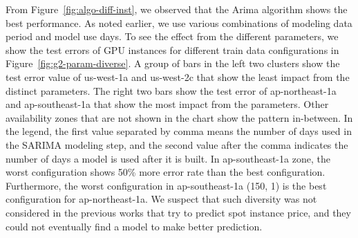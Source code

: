 \documentclass[graybox]{svmult}
\begin{document}
From Figure~\ref{fig:algo-diff-inst}, we observed that the Arima algorithm shows the best performance. As noted earlier, we use various combinations of modeling data period and model use days. To see the effect from the different parameters, we show the test errors of GPU instances for different train data configurations in Figure~\ref{fig:g2-param-diverse}. A group of bars in the left two clusters show the test error value of us-west-1a and us-west-2c that show the least impact from the distinct parameters. The right two bars show the test error of ap-northeast-1a and ap-southeast-1a that show the most impact from the parameters. Other availability zones that are not shown in the chart show the pattern in-between. In the legend, the first value separated by comma means the number of days used in the SARIMA modeling step, and the second value after the comma indicates the number of days a model is used after it is built. In ap-southeast-1a zone, the worst configuration shows 50\% more error rate than the best configuration. Furthermore, the worst configuration in ap-southeast-1a (150, 1) is the best configuration for ap-northeast-1a. We suspect that such diversity was not considered in the previous works that try to predict spot instance price, and they could not eventually find a model to make better prediction. 
\end{document}
